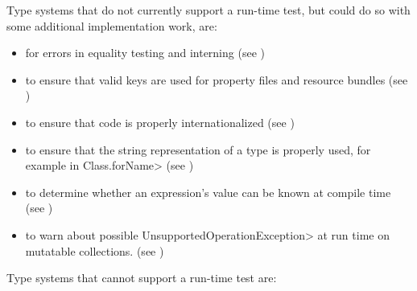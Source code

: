 Type systems that do not currently support a run-time test, but could do so with some
additional implementation work, are:

\begin{itemize}
\item
   for errors in equality
  testing and interning (see )
\item
   to ensure that valid
  keys are used for property files and resource bundles (see
  )
\item
   to
  ensure that code is properly internationalized (see
  )
\item
   to ensure that the
  string representation of a type is properly used, for example in
  \<Class.forName> (see )
\item
   to determine
  whether an expression's value can be known at compile time
  (see )
\item
   to
  warn about possible \<UnsupportedOperationException> at run time on mutatable collections. (see )
\end{itemize}


Type systems that cannot support a run-time test are:

